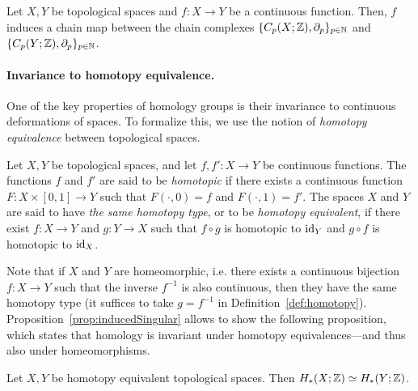\begin{prop}\label{prop:inducedSingular}
Let $X,Y$ be topological spaces and $f:X\rightarrow Y$ be a continuous function. Then, $f$ induces a
chain map between the chain complexes $\{C_p(X;\mathbb{Z}),\partial_p\}_{p\in\mathbb{N}}$ and $\{C_p(Y;\mathbb{Z}),\partial_p\}_{p\in\mathbb{N}}$. 
\end{prop}

\paragraph*{Invariance to homotopy equivalence.} One of the key properties of homology groups
is their invariance to continuous deformations of spaces. To formalize this, we use the notion of {\em homotopy equivalence}
between topological spaces.

\begin{defin}\label{def:homotopy}
Let $X,Y$ be topological spaces, and let $f,f':X\rightarrow Y$ be continuous functions. The functions $f$ and $f'$
are said to be {\em homotopic} if there exists a continuous function $F:X\times [0,1]\rightarrow Y$ such that $F(\cdot,0)=f$ and $F(\cdot,1)=f'$.
The spaces $X$ and $Y$ are said to have {\em the same homotopy type}, or to be {\em homotopy equivalent}, 
if there exist $f:X\rightarrow Y$ and $g:Y\rightarrow X$ such that
$f\circ g$ is homotopic to ${\rm id}_Y$ and $g\circ f$ is homotopic to ${\rm id}_X$.
\end{defin}

Note that if $X$ and $Y$ are homeomorphic, i.e. there exists a continuous bijection $f:X\rightarrow Y$ such that the inverse $f^{-1}$ is also
continuous, then they have the same homotopy type (it suffices to take $g=f^{-1}$ in Definition~\ref{def:homotopy}).
Proposition~\ref{prop:inducedSingular} allows to show the following proposition, which states that homology is
invariant under homotopy equivalences---and thus also under homeomorphisms.

\begin{prop}
Let $X,Y$ be homotopy equivalent topological spaces. Then $H_*(X;\mathbb{Z})\simeq H_*(Y;\mathbb{Z})$.
\end{prop}


